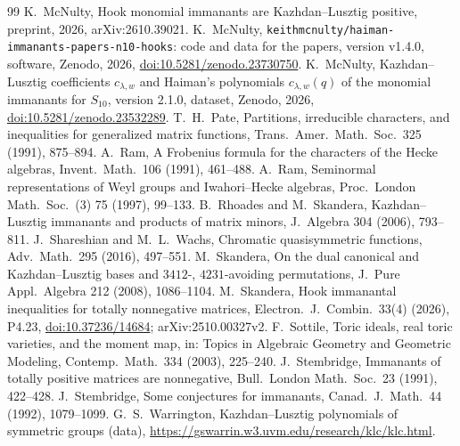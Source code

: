 \documentclass[11pt]{amsart}
\theoremstyle{definition}
\theoremstyle{remark}
\begin{document}
\begin{thebibliography}{99}
 K.~McNulty, Hook monomial immanants are Kazhdan--Lusztig positive, preprint, 2026, arXiv:2610.39021.
 K.~McNulty, \texttt{keithmcnulty/haiman-immanants-papers-n10-hooks}: code and data for the papers, version v1.4.0, software, Zenodo, 2026, \href{https://doi.org/10.5281/zenodo.23730750}{doi:10.5281/zenodo.23730750}.
 K.~McNulty, Kazhdan--Lusztig coefficients $c_{\lambda,w}$ and Haiman's polynomials $c_{\lambda,w}(q)$ of the monomial immanants for $S_{10}$, version 2.1.0, dataset, Zenodo, 2026, \href{https://doi.org/10.5281/zenodo.23532289}{doi:10.5281/zenodo.23532289}.
 T.~H.~Pate, Partitions, irreducible characters, and inequalities for generalized matrix functions, Trans.\ Amer.\ Math.\ Soc.\ 325 (1991), 875--894.
 A.~Ram, A Frobenius formula for the characters of the Hecke algebras, Invent.\ Math.\ 106 (1991), 461--488.
 A.~Ram, Seminormal representations of Weyl groups and Iwahori--Hecke algebras, Proc.\ London Math.\ Soc.\ (3) 75 (1997), 99--133.
 B.~Rhoades and M.~Skandera, Kazhdan--Lusztig immanants and products of matrix minors, J.\ Algebra 304 (2006), 793--811.
 J.~Shareshian and M.~L.~Wachs, Chromatic quasisymmetric functions, Adv.\ Math.\ 295 (2016), 497--551.
 M.~Skandera, On the dual canonical and Kazhdan--Lusztig bases and $3412$-, $4231$-avoiding permutations, J.\ Pure Appl.\ Algebra 212 (2008), 1086--1104.
 M.~Skandera, Hook immanantal inequalities for totally nonnegative matrices, Electron.\ J.\ Combin.\ 33(4) (2026), P4.23, \href{https://doi.org/10.37236/14684}{doi:10.37236/14684}; arXiv:2510.00327v2.
 F.~Sottile, Toric ideals, real toric varieties, and the moment map, in: Topics in Algebraic Geometry and Geometric Modeling, Contemp.\ Math.\ 334 (2003), 225--240.
 J.~Stembridge, Immanants of totally positive matrices are nonnegative, Bull.\ London Math.\ Soc.\ 23 (1991), 422--428.
 J.~Stembridge, Some conjectures for immanants, Canad.\ J.\ Math.\ 44 (1992), 1079--1099.
 G.~S.~Warrington, Kazhdan--Lusztig polynomials of symmetric groups (data), \url{https://gswarrin.w3.uvm.edu/research/klc/klc.html}.
\end{thebibliography}
\end{document}
